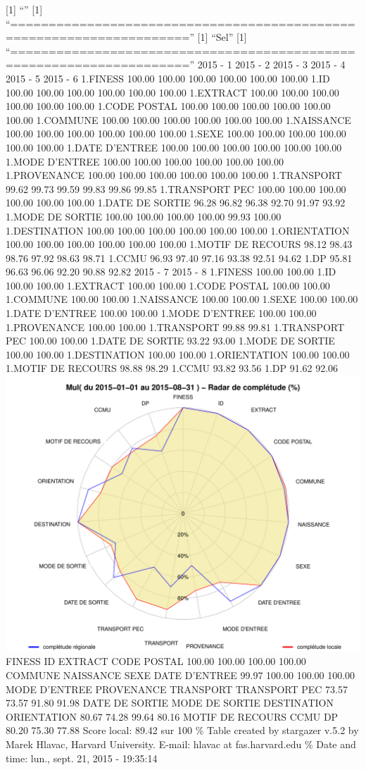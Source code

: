 \documentclass[]{article}
\begin{document}
{[}1{]} ``'' {[}1{]}
``=====================================================================''
{[}1{]} ``Sel'' {[}1{]}
``=====================================================================''
2015 - 1 2015 - 2 2015 - 3 2015 - 4 2015 - 5 2015 - 6 1.FINESS 100.00
100.00 100.00 100.00 100.00 100.00 1.ID 100.00 100.00 100.00 100.00
100.00 100.00 1.EXTRACT 100.00 100.00 100.00 100.00 100.00 100.00 1.CODE
POSTAL 100.00 100.00 100.00 100.00 100.00 100.00 1.COMMUNE 100.00 100.00
100.00 100.00 100.00 100.00 1.NAISSANCE 100.00 100.00 100.00 100.00
100.00 100.00 1.SEXE 100.00 100.00 100.00 100.00 100.00 100.00 1.DATE
D'ENTREE 100.00 100.00 100.00 100.00 100.00 100.00 1.MODE D'ENTREE
100.00 100.00 100.00 100.00 100.00 100.00 1.PROVENANCE 100.00 100.00
100.00 100.00 100.00 100.00 1.TRANSPORT 99.62 99.73 99.59 99.83 99.86
99.85 1.TRANSPORT PEC 100.00 100.00 100.00 100.00 100.00 100.00 1.DATE
DE SORTIE 96.28 96.82 96.38 92.70 91.97 93.92 1.MODE DE SORTIE 100.00
100.00 100.00 100.00 99.93 100.00 1.DESTINATION 100.00 100.00 100.00
100.00 100.00 100.00 1.ORIENTATION 100.00 100.00 100.00 100.00 100.00
100.00 1.MOTIF DE RECOURS 98.12 98.43 98.76 97.92 98.63 98.71 1.CCMU
96.93 97.40 97.16 93.38 92.51 94.62 1.DP 95.81 96.63 96.06 92.20 90.88
92.82 2015 - 7 2015 - 8 1.FINESS 100.00 100.00 1.ID 100.00 100.00
1.EXTRACT 100.00 100.00 1.CODE POSTAL 100.00 100.00 1.COMMUNE 100.00
100.00 1.NAISSANCE 100.00 100.00 1.SEXE 100.00 100.00 1.DATE D'ENTREE
100.00 100.00 1.MODE D'ENTREE 100.00 100.00 1.PROVENANCE 100.00 100.00
1.TRANSPORT 99.88 99.81 1.TRANSPORT PEC 100.00 100.00 1.DATE DE SORTIE
93.22 93.00 1.MODE DE SORTIE 100.00 100.00 1.DESTINATION 100.00 100.00
1.ORIENTATION 100.00 100.00 1.MOTIF DE RECOURS 98.88 98.29 1.CCMU 93.82
93.56 1.DP 91.62 92.06
\includegraphics{completude_files/figure-latex/finess-3.pdf} FINESS ID
EXTRACT CODE POSTAL 100.00 100.00 100.00 100.00 COMMUNE NAISSANCE SEXE
DATE D'ENTREE 99.97 100.00 100.00 100.00 MODE D'ENTREE PROVENANCE
TRANSPORT TRANSPORT PEC 73.57 73.57 91.80 91.98 DATE DE SORTIE MODE DE
SORTIE DESTINATION ORIENTATION 80.67 74.28 99.64 80.16 MOTIF DE RECOURS
CCMU DP 80.20 75.30 77.88 Score local: 89.42 sur 100 \% Table created by
stargazer v.5.2 by Marek Hlavac, Harvard University. E-mail: hlavac at
fas.harvard.edu \% Date and time: lun., sept. 21, 2015 - 19:35:14
\end{document}
